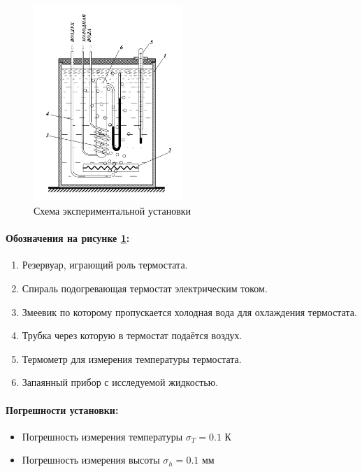 \documentclass[a4paper,12pt]{article} %
\begin{document}
\begin{figure}[h] %
\begin{center}
\includegraphics[width=0.5\textwidth]{setup.png}
\end{center}
\caption{Схема экспериментальной установки}
\label{fig:setup}
\end{figure}

\paragraph{Обозначения на рисунке \ref{fig:setup}:}

\begin{enumerate}
\renewcommand{\labelenumi}{\arabic{enumi} --}
\itemsep0em

\item Резервуар, играющий роль термостата.
\item Спираль подогревающая термостат электрическим током.
\item Змеевик по которому пропускается холодная вода для охлаждения термостата.
\item Трубка через которую в термостат подаётся воздух.
\item Термометр для измерения температуры термостата.
\item Запаянный прибор с исследуемой жидкостью.

\end{enumerate}

\paragraph{Погрешности установки:}
\begin{itemize}
\renewcommand{\labelitemi}{$\triangleright$}
\item Погрешность измерения температуры $\sigma_T = 0.1$ К
\item Погрешность измерения высоты $\sigma_h = 0.1$ мм
\end{itemize}
\end{document}
